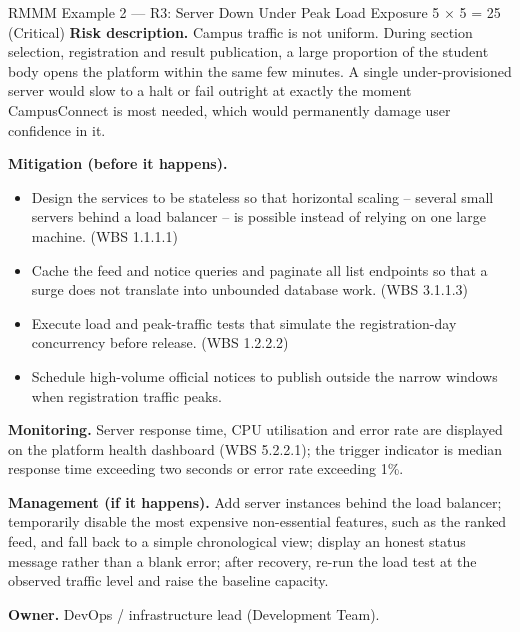 \documentclass[11pt,a4paper]{report}
\begin{document}
\begin{riskcard}{RMMM Example 2 --- R3: Server Down Under Peak Load \hfill Exposure 5 $\times$ 5 = 25 (Critical)}
\textbf{Risk description.} Campus traffic is not uniform. During section
selection, registration and result publication, a large proportion of the
student body opens the platform within the same few minutes. A single
under-provisioned server would slow to a halt or fail outright at exactly the
moment CampusConnect is most needed, which would permanently damage user
confidence in it.

\medskip
\textbf{Mitigation (before it happens).}
\begin{itemize}[nosep]
  \item Design the services to be stateless so that horizontal scaling --
  several small servers behind a load balancer -- is possible instead of relying
  on one large machine. (WBS 1.1.1.1)
  \item Cache the feed and notice queries and paginate all list endpoints so
  that a surge does not translate into unbounded database work. (WBS 3.1.1.3)
  \item Execute load and peak-traffic tests that simulate the registration-day
  concurrency before release. (WBS 1.2.2.2)
  \item Schedule high-volume official notices to publish outside the narrow
  windows when registration traffic peaks.
\end{itemize}

\medskip
\textbf{Monitoring.} Server response time, CPU utilisation and error rate are
displayed on the platform health dashboard (WBS 5.2.2.1); the trigger indicator
is median response time exceeding two seconds or error rate exceeding 1\%.

\medskip
\textbf{Management (if it happens).} Add server instances behind the load
balancer; temporarily disable the most expensive non-essential features, such as
the ranked feed, and fall back to a simple chronological view; display an honest
status message rather than a blank error; after recovery, re-run the load test at
the observed traffic level and raise the baseline capacity.

\medskip
\textbf{Owner.} DevOps / infrastructure lead (Development Team).
\end{riskcard}
\end{document}
